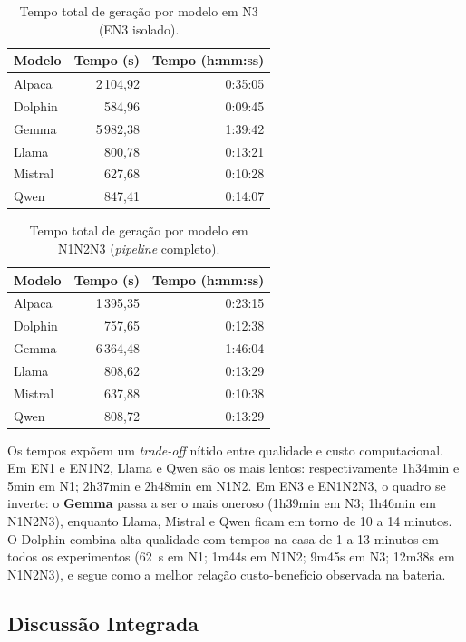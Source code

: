 \documentclass[a4paper,fleqn]{cas-sc}
\newcommand{\melhor}[1]{\textcolor{green!55!black}{#1}}
\newcommand{\pior}[1]{\textcolor{red!80!black}{#1}}
\begin{document}
\begin{table}[ht]
\centering
\caption{Tempo total de geração por modelo em N3 (EN3 isolado).}
\label{tab:tempo_n3}
\begin{tabular}{lrr}
\hline
Modelo & Tempo (s) & Tempo (h:mm:ss) \\
\hline
Alpaca  & 2\,104{,}92 & 0:35:05 \\
Dolphin & \melhor{584{,}96} & \melhor{0:09:45} \\
Gemma   & \pior{5\,982{,}38} & \pior{1:39:42} \\
Llama   & 800{,}78 & 0:13:21 \\
Mistral & 627{,}68 & 0:10:28 \\
Qwen    & 847{,}41 & 0:14:07 \\
\hline
\end{tabular}
\end{table}

\begin{table}[ht]
\centering
\caption{Tempo total de geração por modelo em N1N2N3 (\textit{pipeline} completo).}
\label{tab:tempo_n1n2n3}
\begin{tabular}{lrr}
\hline
Modelo & Tempo (s) & Tempo (h:mm:ss) \\
\hline
Alpaca  & 1\,395{,}35 & 0:23:15 \\
Dolphin & 757{,}65 & 0:12:38 \\
Gemma   & \pior{6\,364{,}48} & \pior{1:46:04} \\
Llama   & 808{,}62 & 0:13:29 \\
Mistral & \melhor{637{,}88} & \melhor{0:10:38} \\
Qwen    & 808{,}72 & 0:13:29 \\
\hline
\end{tabular}
\end{table}

Os tempos expõem um \textit{trade-off} nítido entre qualidade e custo computacional. Em EN1 e EN1N2, Llama e Qwen são os mais lentos: respectivamente 1h34min e 5min em N1; 2h37min e 2h48min em N1N2. Em EN3 e EN1N2N3, o quadro se inverte: o \textbf{Gemma} passa a ser o mais oneroso (1h39min em N3; 1h46min em N1N2N3), enquanto Llama, Mistral e Qwen ficam em torno de 10 a 14 minutos. O Dolphin combina alta qualidade com tempos na casa de 1 a 13 minutos em todos os experimentos (62~s em N1; 1m44s em N1N2; 9m45s em N3; 12m38s em N1N2N3), e segue como a melhor relação custo-benefício observada na bateria.

\subsection{Discussão Integrada}
\end{document}
